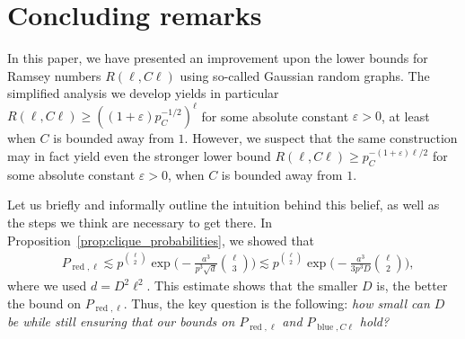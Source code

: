 \documentclass[11pt]{amsart}
\theoremstyle{definition}
\def\eps{\varepsilon}
\DeclareMathOperator{\red}{red}
\DeclareMathOperator{\blue}{blue}
\begin{document}
\section{Concluding remarks}\label{sec:concluding}

In this paper, we have presented an improvement upon the lower bounds for Ramsey numbers $R(\ell, C\ell)$ using so-called Gaussian random graphs. The simplified analysis we develop yields in particular $R(\ell, C\ell)\geq ((1+\eps)p_C^{-1/2})^{\ell}$ for some absolute constant $\eps>0$, at least when $C$ is bounded away from $1$. However, we suspect that the same construction may in fact yield even the stronger lower bound $R(\ell, C\ell)\geq p_C^{-(1+\eps)\ell/2}$ for some absolute constant $\eps>0$, when $C$ is bounded away from $1$.

Let us briefly and informally outline the intuition behind this belief, as well as the steps we think are necessary to get there. In Proposition~\ref{prop:clique_probabilities}, we showed that
{\smaller[0.3]
\begin{align*}
&P_{\red, \ell}\lesssim p^{\binom{\ell}{2}}\exp\bigg(-\frac{a^3}{p^3\sqrt{d}}\binom{\ell}{3}\bigg)\lesssim p^{\binom{\ell}{2}}\exp\bigg(-\frac{a^3}{3p^3 D}\binom{\ell}{2}\bigg),
\end{align*}
}\noindent
where we used $d=D^2\ell^2$. This estimate shows that the smaller $D$ is, the better the bound on $P_{\red, \ell}$. Thus, the key question is the following: \textit{how small can $D$ be while still ensuring that our bounds on $P_{\red, \ell}$ and $P_{\blue, C\ell}$ hold?}
\end{document}
